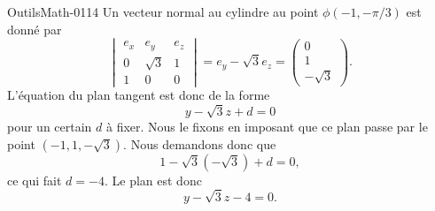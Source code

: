 \begin{corrige}{OutilsMath-0114}
    Un vecteur normal au cylindre au point $\phi(-1,-\pi/3)$ est donné par
    \begin{equation}
        \begin{vmatrix}
            e_x    &   e_y    &   e_z    \\
            0    &   \sqrt{3}    &   1    \\
            1    &   0    &   0
        \end{vmatrix}=e_y-\sqrt{3}e_z=\begin{pmatrix}
            0    \\ 
            1    \\ 
            -\sqrt{3}    
        \end{pmatrix}.
    \end{equation}
    L'équation du plan tangent est donc de la forme
    \begin{equation}
        y-\sqrt{3}z+d=0
    \end{equation}
    pour un certain $d$ à fixer. Nous le fixons en imposant que ce plan passe par le point $(-1,1,-\sqrt{3})$. Nous demandons donc que
    \begin{equation}
        1-\sqrt{3}(-\sqrt{3})+d=0,
    \end{equation}
    ce qui fait $d=-4$. Le plan est donc
    \begin{equation}
        y-\sqrt{3}z-4=0.
    \end{equation}

\end{corrige}
